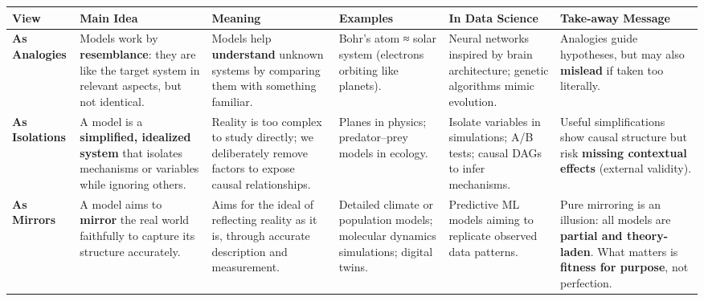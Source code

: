 \documentclass[
  12pt,
]{book}
\begin{document}
\begin{longtable}[]{@{}
  >{\raggedright\arraybackslash}p{}
  >{\raggedright\arraybackslash}p{}
  >{\raggedright\arraybackslash}p{}
  >{\raggedright\arraybackslash}p{}
  >{\raggedright\arraybackslash}p{}
  >{\raggedright\arraybackslash}p{}@{}}
\toprule\noalign{}
\begin{minipage}[b]{\linewidth}\raggedright
\textbf{View}
\end{minipage} & \begin{minipage}[b]{\linewidth}\raggedright
\textbf{Main Idea}
\end{minipage} & \begin{minipage}[b]{\linewidth}\raggedright
\textbf{Meaning}
\end{minipage} & \begin{minipage}[b]{\linewidth}\raggedright
\textbf{Examples}
\end{minipage} & \begin{minipage}[b]{\linewidth}\raggedright
\textbf{In Data Science}
\end{minipage} & \begin{minipage}[b]{\linewidth}\raggedright
\textbf{Take-away Message}
\end{minipage} \\
\midrule\noalign{}
\endhead
\bottomrule\noalign{}
\endlastfoot
\textbf{As Analogies} & Models work by \textbf{resemblance}: they are like the target system in relevant aspects, but not identical. & Models help \textbf{understand} unknown systems by comparing them with something familiar. & Bohr's atom ≈ solar system (electrons orbiting like planets). & Neural networks inspired by brain architecture; genetic algorithms mimic evolution. & Analogies guide hypotheses, but may also \textbf{mislead} if taken too literally. \\
\textbf{As Isolations} & A model is a \textbf{simplified, idealized system} that isolates mechanisms or variables while ignoring others. & Reality is too complex to study directly; we deliberately remove factors to expose causal relationships. & Planes in physics; predator--prey models in ecology. & Isolate variables in simulations; A/B tests; causal DAGs to infer mechanisms. & Useful simplifications show causal structure but risk \textbf{missing contextual effects} (external validity). \\
\textbf{As Mirrors} & A model aims to \textbf{mirror} the real world faithfully to capture its structure accurately. & Aims for the ideal of reflecting reality as it is, through accurate description and measurement. & Detailed climate or population models; molecular dynamics simulations; digital twins. & Predictive ML models aiming to replicate observed data patterns. & Pure mirroring is an illusion: all models are \textbf{partial and theory-laden}. What matters is \textbf{fitness for purpose}, not perfection. \\
\end{longtable}
\end{document}
